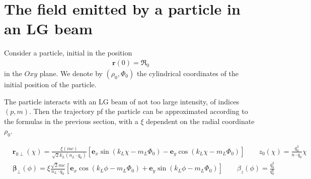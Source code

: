 \section{The field emitted by a particle in an LG beam}

Consider a particle, initial in the position
\begin{align}
  {\bm r}(0) = {\boldsymbol{\mathfrak R}}_0
\end{align}
in the $Oxy$ plane. We denote by $(\rho_0, \varPhi_0)$ the cylindrical coordinates of the initial position of the particle.

The particle interacts with an LG beam of not too large intensity, of indices $(p,m)$. Then the trajectory pf the particle can be approximated according to the formulas in the previous section, with a $\xi$ dependent on the radial coordinate $\rho_0$.
\begin{importantbox}
  \begin{align}
    & {\bm r}_{0\perp}(\chi)=\frac{\xi (mc)}{\sqrt{2}k_L(n_L\cdot q_0)}\left[{\bm e}_x\sin(k_L\chi-m_L\varPhi_0)-{\bm e}_y\cos(k_L\chi-m_L\varPhi_0)\right]                                                  \qquad z_0(\chi)=\frac{q_0^3}{n\cdot q_0}\chi\\
    & {\boldsymbol{\beta}}_\perp(\phi)=\xi\frac{\sqrt{2}mc}{n_L\cdot q_0}\left[{\bm e}_x\cos(k_L\phi-m_L\varPhi_0)+{\bm e}_y\sin(k_L\phi-m_L\varPhi_0)\right]\qquad  \beta_z(\phi) =\frac{q_0^3}{q_0^0}
  \end{align}
\end{importantbox}

